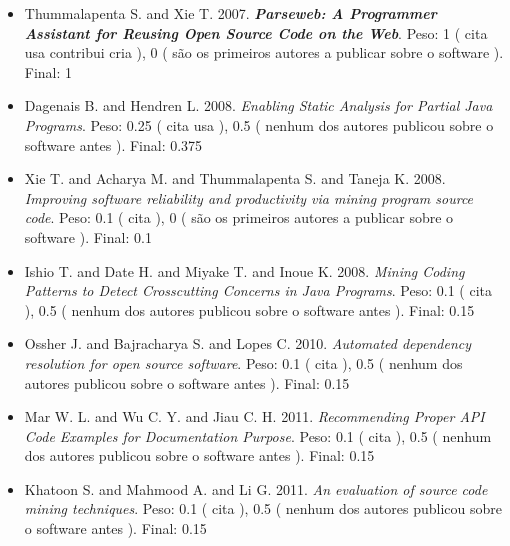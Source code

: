 \begin{itemize}
\item Thummalapenta S. and Xie T.
      2007.
        \textbf{\textit{ Parseweb: A Programmer Assistant for Reusing Open Source Code on the Web}}.
      Peso:
      1 (
          cita
          usa
          contribui
          cria
      ),
      0 (
são os primeiros autores a publicar sobre o software
      ).
      Final:
      1

\item Dagenais B. and Hendren L.
      2008.
        \textit{ Enabling Static Analysis for Partial Java Programs}.
      Peso:
      0.25 (
          cita
          usa
      ),
      0.5 (
nenhum dos autores publicou sobre o software antes
      ).
      Final:
      0.375

\item Xie T. and Acharya M. and Thummalapenta S. and Taneja K.
      2008.
        \textit{ Improving software reliability and productivity via mining program source code}.
      Peso:
      0.1 (
          cita
      ),
      0 (
são os primeiros autores a publicar sobre o software
      ).
      Final:
      0.1

\item Ishio T. and Date H. and Miyake T. and Inoue K.
      2008.
        \textit{ Mining Coding Patterns to Detect Crosscutting Concerns in Java Programs}.
      Peso:
      0.1 (
          cita
      ),
      0.5 (
nenhum dos autores publicou sobre o software antes
      ).
      Final:
      0.15

\item Ossher J. and Bajracharya S. and Lopes C.
      2010.
        \textit{ Automated dependency resolution for open source software}.
      Peso:
      0.1 (
          cita
      ),
      0.5 (
nenhum dos autores publicou sobre o software antes
      ).
      Final:
      0.15

\item Mar W. L. and Wu C. Y. and Jiau C. H.
      2011.
        \textit{ Recommending Proper API Code Examples for Documentation Purpose}.
      Peso:
      0.1 (
          cita
      ),
      0.5 (
nenhum dos autores publicou sobre o software antes
      ).
      Final:
      0.15

\item Khatoon S. and Mahmood A. and Li G.
      2011.
        \textit{ An evaluation of source code mining techniques}.
      Peso:
      0.1 (
          cita
      ),
      0.5 (
nenhum dos autores publicou sobre o software antes
      ).
      Final:
      0.15


\end{itemize}

